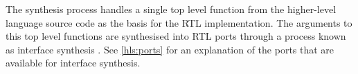 The synthesis process handles a single top level function from the higher-level
language source code as the basis for the \gls{RTL} implementation. The
arguments to this top level functions are synthesised into \gls{RTL} ports
through a process known as interface synthesis \cite{Xilinx:CodingStyleGuide}.
See \autoref{hls:ports} for an explanation of the ports that are available for
interface synthesis.

\begin{comment}
Interface synthesis automatically handles the data sequencing to and from the design: the user simply needs to select the appropriate interface.
Many types of interfaces can be synthesized: wire ports, single and two-way handshakes, RAM access ports and FIFO ports among others.
\end{comment}

